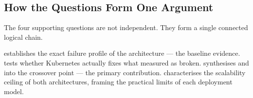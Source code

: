 \subsection*{How the Questions Form One Argument}

The four supporting questions are not independent. They form a single connected logical
chain.

 establishes the exact failure profile of the \vm{} architecture --- the baseline
evidence.  tests whether Kubernetes actually fixes what  measured as broken.
 synthesises  and  into the crossover point --- the primary contribution.
 characterises the scalability ceiling of both architectures, framing the practical
limits of each deployment model.
